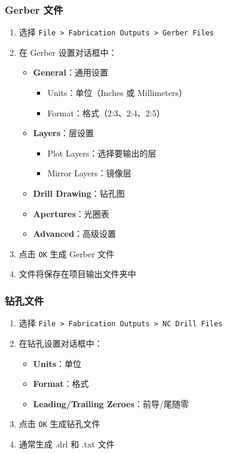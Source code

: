 \subsubsection{Gerber 文件}


\begin{enumerate}
  \item 选择 \lstinline{File > Fabrication Outputs > Gerber Files}
  \item 在 Gerber 设置对话框中：
    \begin{itemize}
      \item \textbf{General}：通用设置
        \begin{itemize}
          \item Units：单位（Inches 或 Millimeters）
          \item Format：格式（2:3、2:4、2:5）
        \end{itemize}
      \item \textbf{Layers}：层设置
        \begin{itemize}
          \item Plot Layers：选择要输出的层
          \item Mirror Layers：镜像层
        \end{itemize}
      \item \textbf{Drill Drawing}：钻孔图
      \item \textbf{Apertures}：光圈表
      \item \textbf{Advanced}：高级设置
    \end{itemize}
  \item 点击 \lstinline{OK} 生成 Gerber 文件
  \item 文件将保存在项目输出文件夹中
\end{enumerate}

\subsubsection{钻孔文件}


\begin{enumerate}
  \item 选择 \lstinline{File > Fabrication Outputs > NC Drill Files}
  \item 在钻孔设置对话框中：
    \begin{itemize}
      \item \textbf{Units}：单位
      \item \textbf{Format}：格式
      \item \textbf{Leading/Trailing Zeroes}：前导/尾随零
    \end{itemize}
  \item 点击 \lstinline{OK} 生成钻孔文件
  \item 通常生成 .drl 和 .txt 文件
\end{enumerate}

